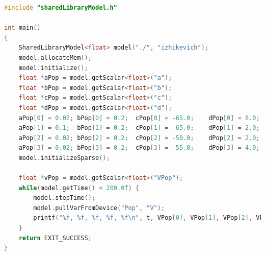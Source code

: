 \documentclass[utf8]{frontiersSCNS} %
\begin{document}
%
\begin{lstlisting}[language=C++]
#include "sharedLibraryModel.h"

int main()
{
    SharedLibraryModel<float> model("./", "izhikevich");
    model.allocateMem();
    model.initialize();
    float *aPop = model.getScalar<float>("a");
    float *bPop = model.getScalar<float>("b");
    float *cPop = model.getScalar<float>("c");
    float *dPop = model.getScalar<float>("d");
    aPop[0] = 0.02; bPop[0] = 0.2;  cPop[0] = -65.0;    dPop[0] = 8.0;  // RS
    aPop[1] = 0.1;  bPop[1] = 0.2;  cPop[1] = -65.0;    dPop[1] = 2.0;  // FS
    aPop[2] = 0.02; bPop[2] = 0.2;  cPop[2] = -50.0;    dPop[2] = 2.0;  // CH
    aPop[3] = 0.02; bPop[3] = 0.2;  cPop[3] = -55.0;    dPop[3] = 4.0;  // IB
    model.initializeSparse();

    float *vPop = model.getScalar<float>("VPop");
    while(model.getTime() < 200.0f) {
        model.stepTime();
        model.pullVarFromDevice("Pop", "V");
        printf("%f, %f, %f, %f, %f\n", t, VPop[0], VPop[1], VPop[2], VPop[3]);
    }
    return EXIT_SUCCESS;
}
\end{lstlisting}
\end{document}
